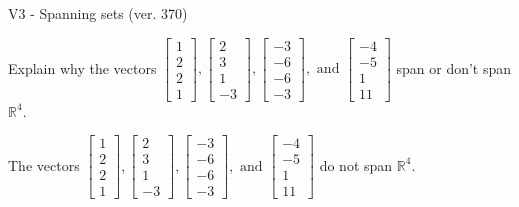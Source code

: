 \begin{exercise}
  \begin{exerciseTitle}V3 - Spanning sets (ver. 370)\end{exerciseTitle}
  \begin{exerciseStatement}
    Explain why the vectors \(\left[\begin{array}{r}
1 \\
2 \\
2 \\
1
\end{array}\right] , \left[\begin{array}{r}
2 \\
3 \\
1 \\
-3
\end{array}\right] , \left[\begin{array}{r}
-3 \\
-6 \\
-6 \\
-3
\end{array}\right] , \text{ and } \left[\begin{array}{r}
-4 \\
-5 \\
1 \\
11
\end{array}\right]\) span or don't span \(\mathbb{R}^4\). 
	


  \end{exerciseStatement}
  \begin{exerciseAnswer}
   The vectors \(\left[\begin{array}{r}
1 \\
2 \\
2 \\
1
\end{array}\right] , \left[\begin{array}{r}
2 \\
3 \\
1 \\
-3
\end{array}\right] , \left[\begin{array}{r}
-3 \\
-6 \\
-6 \\
-3
\end{array}\right] , \text{ and } \left[\begin{array}{r}
-4 \\
-5 \\
1 \\
11
\end{array}\right]\) 
  	 do not  
	span \(\mathbb{R}^4\).
  


  \end{exerciseAnswer}
\end{exercise}